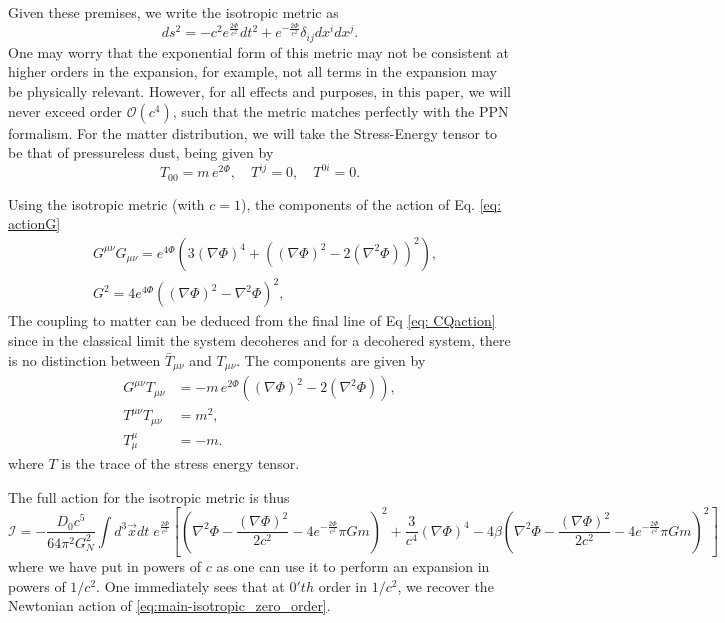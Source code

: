 \documentclass[aps,pra,amsmath,amssymb,amsthm,floatfix,nofootinbib,notitlepage,superscriptaddress,10pt]{revtex4-2}
\def\actionC{\mathcal{I}}
\begin{document}
Given these premises, we write the isotropic metric as
\begin{equation}
	ds^2=-c^2 e^{\frac{2\Phi}{c^2}}dt^2+e^{-\frac{2\Phi}{c^2}}\delta_{ij}dx^idx^j.
\end{equation}
One may worry that the exponential form of this metric may not be consistent at higher orders in the expansion, for example, not all terms in the expansion may be physically relevant. However, for all effects and purposes, in this paper, we will never exceed order $\mathcal{O}(c^{4})$, such that the metric matches perfectly with the PPN formalism.
For the matter distribution, we will take the Stress-Energy tensor to be that of pressureless dust, being given by
\begin{equation}
	T_{00}=m\, e^{2\Phi}, \quad T^{ij}=0, \quad T^{0i}=0.
\end{equation}


Using the isotropic metric (with $c=1$), the components of the action of Eq. \eqref{eq: actionG}
\begin{align}
	&G^{\mu\nu}G_{\mu\nu}= e^{4\Phi} \left( 3\left(\nabla\Phi\right)^4+\left( \left(\nabla\Phi\right)^2-2
	\left(\nabla^2\Phi\right)\right)^2\right),\\
	&G^2=4e^{4 \Phi} \left(  \left(\nabla\Phi\right)^2-\nabla^2\Phi\right)^2,
\end{align}
The coupling to matter can be deduced from the final line of Eq \eqref{eq: CQaction} since in the classical limit the system decoheres and for a decohered system, there is no distinction between
$\bar{T}_{\mu\nu}$ and $T_{\mu\nu}$.
The components are given by
\begin{align}
	G^{\mu\nu}T_{\mu\nu} &= -m\,e^{2\Phi}\left(  \left(\nabla\Phi\right)^2-2\left(\nabla^2\Phi\right)\right),\\
	T^{\mu\nu}T_{\mu\nu}&=m^2,\\
	T^\mu_\mu&=-m.
\end{align}
where $T$ is the trace of the stress energy tensor.

The full action for the isotropic metric is thus
\begin{equation}
	\actionC=-\frac{D_0 c^5}{64\pi^2G_N^2}\int d^3\vec{x}dt\; e^{\frac{2\Phi}{c^2}}\left[\left(\nabla^2\Phi-\frac{(\nabla\Phi)^2}{2c^2}-4e^{-\frac{2\Phi}{c^2}}\pi Gm\right)^2+\frac{3}{c^4}(\nabla\Phi)^4-4\beta\left(\nabla^2\Phi-\frac{(\nabla\Phi)^2}{2c^2}-4e^{-\frac{2\Phi}{c^2}}\pi Gm \right)^2\right]
	\label{eq: isotropic action}
\end{equation}
where we have put in powers of $c$ as one can use it to perform an expansion in powers of $1/c^2$. One immediately sees that at $0'th$ order in $1/c^2$, we recover the Newtonian action of \eqref{eq:main-isotropic_zero_order}.
\end{document}

